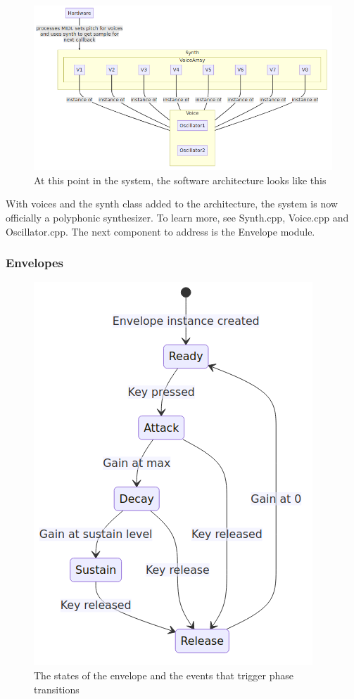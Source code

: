 \documentclass[acmlarge,screen]{acmart}
\begin{document}
	\begin{figure}[H]
		\includegraphics[width=\linewidth]{voice_graph_diagram}
		\caption{At this point in the system, the software architecture looks like this}
		\centering
	\end{figure}
	
	With voices and the synth class added to the architecture, the system is now officially a polyphonic synthesizer. To learn more, see Synth.cpp, Voice.cpp and Oscillator.cpp. The next component to address is the Envelope module.


	\subsubsection{Envelopes}
	
	\begin{figure}
		\centering
		\caption{The states of the envelope and the events that trigger phase transitions}
		\includegraphics[width=.8\linewidth]{envelope_state_diagram}
	\end{figure}
	
\end{document}
